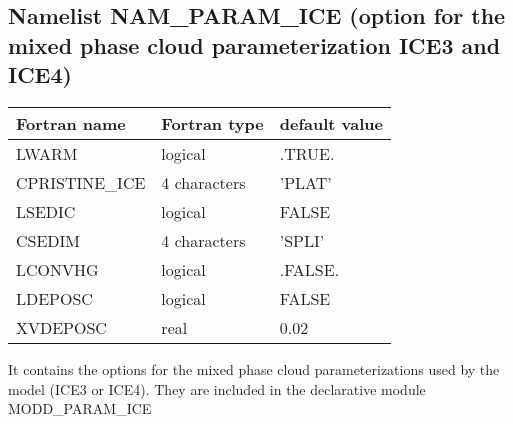 \subsection{Namelist NAM\_PARAM\_ICE (option for the mixed phase cloud 
parameterization ICE3 and ICE4)}
%
\begin{center}
\begin{tabular} {|l|l|l|}
\hline
Fortran name & Fortran type & default value \\
\hline
LWARM         &  logical     & .TRUE. \\
CPRISTINE\_ICE & 4 characters & 'PLAT' \\
LSEDIC & logical & FALSE \\
CSEDIM & 4 characters & 'SPLI' \\
LCONVHG       &  logical     & .FALSE. \\
LDEPOSC& logical & FALSE \\
XVDEPOSC& real & 0.02 \\
\hline
\end{tabular}
\end{center}

It contains the options for the mixed phase cloud parameterizations
used  by the model (ICE3 or ICE4). They are included in the declarative module
MODD\_PARAM\_ICE

